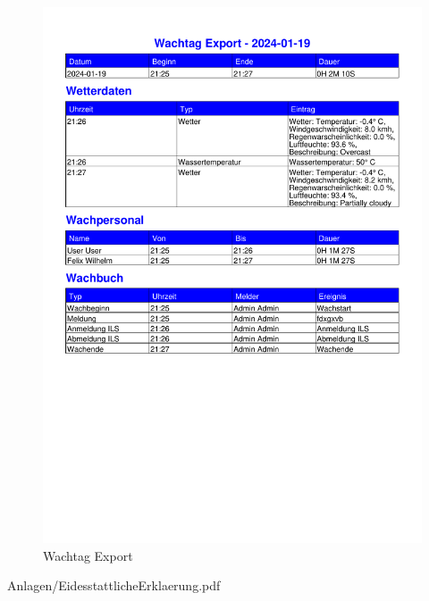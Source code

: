 \documentclass[fontsize=12pt,openright,oneside,paper=a4,BCOR=1cm]{scrbook}
\begin{document}
\begin{appendix}
\begin{figure}[H]
\centering
    \includegraphics[page=1,scale=0.75]{Anlagen/Anwendung/10WachtagExport.pdf}
  \caption{Wachtag Export}
  \label{fig:wachtagexport}
\end{figure}

\end{appendix}

	 




    {Anlagen/EidesstattlicheErklaerung.pdf}

\end{document}
